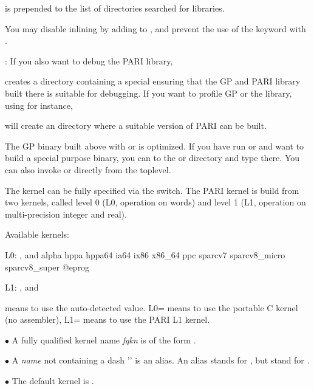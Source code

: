  is prepended to the list of directories
searched for libraries.

You may disable inlining by adding  to ,
and prevent the use of the  keyword with
.

: If you also want to debug the PARI library,


\noindent creates a directory  containing a special
 ensuring that the GP and PARI library built there is
suitable for debugging. If you want to
profile GP or the library, using  for instance,


\noindent will create an  directory where a suitable version
of PARI can be built.

The GP binary built above with  or  is optimized.
If you have run  or  and want to build a special
purpose binary, you can  to the  or  directory
and type  there. You can also invoke  or
 directly from the toplevel.

 The kernel can be fully specified via the
 switch. The PARI kernel is build from two kernels,
called level 0 (L0, operation on words) and level 1 (L1, operation on
multi-precision integer and real).

\noindent Available kernels:

L0: ,  and
\bprog
  alpha hppa hppa64 ia64 ix86 x86_64 ppc sparcv7 sparcv8_micro sparcv8_super
@eprog

L1: ,  and 

\noindent {} means to use the auto-detected value. L0= means
to use the portable C kernel (no assembler), L1= means to use the
PARI L1 kernel. 

\noindent$\bullet$ A fully qualified kernel name \emph{fqkn} is of the form
.

\noindent$\bullet$ A \emph{name} not containing a dash '\kbd{-}' is an alias.
An alias stands for , but  stand for
.

\noindent$\bullet$ The default kernel is .

